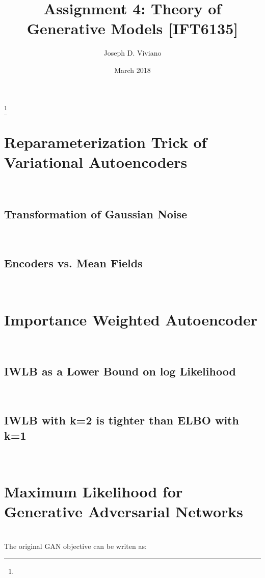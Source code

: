 \documentclass{amsart}
\numberwithin{equation}{section}
\theoremstyle{definition}
\theoremstyle{remark}
\begin{document}
\title{Assignment 4: Theory of Generative Models [IFT6135]}

\author{Joseph D. Viviano}
\address{Universit\'e de Montr\'eal}
\curraddr{}
\thanks{}
\date{March 2018}

\maketitle

\section{Reparameterization Trick of Variational Autoencoders} \\

\subsection{Transformation of Gaussian Noise} \\

\subsection{Encoders vs. Mean Fields} \\

\section{Importance Weighted Autoencoder} \\

\subsection{IWLB as a Lower Bound on log Likelihood} \\

\subsection{IWLB with k=2 is tighter than ELBO with k=1} \\

\section{Maximum Likelihood for Generative Adversarial Networks} \\

The original GAN objective can be writen as: \\
\end{document}
